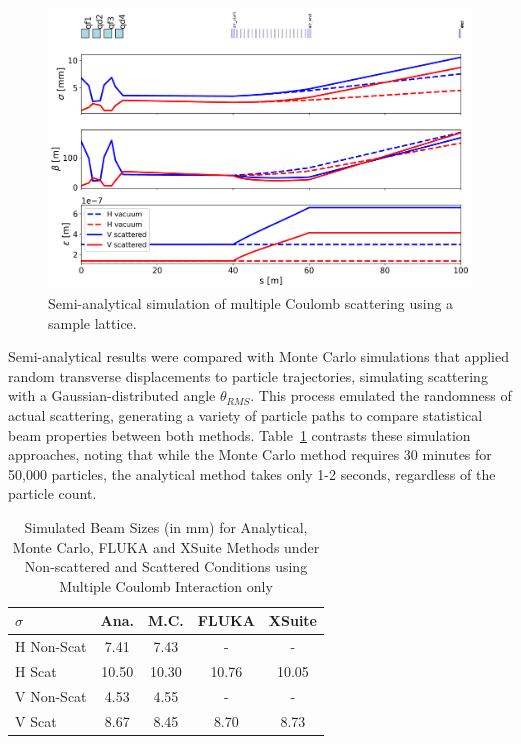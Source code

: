 \documentclass[a4paper,
               biblatex,     %
               ]{jacow}
\begin{document}
\begin{figure}[!htb]
   \centering
   \includegraphics*[width=1.0\columnwidth]{THPR032_f2.png}
   \caption{Semi-analytical simulation of multiple Coulomb scattering using a sample lattice.}
   \label{fig:simple_line}
\end{figure}

Semi-analytical results were compared with Monte Carlo simulations that applied random transverse displacements to particle trajectories, simulating scattering with a Gaussian-distributed angle $\theta_{RMS}$. This process emulated the randomness of actual scattering, generating a variety of particle paths to compare statistical beam properties between both methods. Table~\ref{tab:sigma_comparison} contrasts these simulation approaches, noting that while the Monte Carlo method requires 30 minutes for 50,000 particles, the analytical method takes only 1-2 seconds, regardless of the particle count. 

\begin{table}[ht]
\centering
\caption{Simulated Beam Sizes (in mm) for Analytical, Monte Carlo, FLUKA and XSuite \cite{iadarola:hb2023-tua2i1} Methods under Non-scattered and Scattered Conditions using Multiple Coulomb Interaction only}
\begin{tabular}{lcccc}
\hline
$\sigma$ & Ana. & M.C. & FLUKA & XSuite \\
\hline
H Non-Scat & 7.41 & 7.43 & - & -\\
H Scat & 10.50 & 10.30 & 10.76 & 10.05 \\
V Non-Scat & 4.53 & 4.55 & - & -\\
V Scat & 8.67 & 8.45 & 8.70 & 8.73 \\
\hline
\end{tabular}
\label{tab:sigma_comparison}
\end{table}
\end{document}

